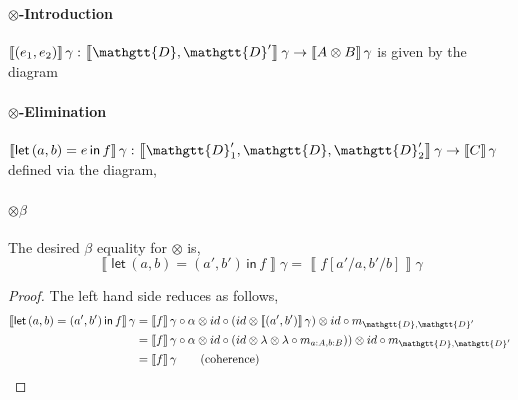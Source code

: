 \documentclass[acmsmall,nonacm]{acmart}
\renewcommand{\Delta}{\mathgtt{D}}
\newcommand{\sem}[1]{\left\llbracket{#1}\right\rrbracket}
\newcommand{\semg}[1]{\sem{#1}\gamma}
\newcommand{\letin}[3]{\mathsf{let}\, #1 = #2 \, \mathsf{in}\, #3}
\begin{document}
{\paragraph{$\otimes$-Introduction}
$\semg{(e_{1}, e_{2})} : \semg{\Delta,\Delta'} \to \semg{A \otimes B}$ is given
by the diagram

\begin{center}
\end{center}

\paragraph{$\otimes$-Elimination}
$\semg{\letin {(a,b)} e f} : \semg{\Delta'_{1},\Delta,\Delta'_{2}} \to \semg{C}$
defined via the diagram,

\begin{center}
\end{center}

\paragraph{$\otimes\beta$}
The desired $\beta$ equality for $\otimes$ is,
\[
  \semg{\letin {(a,b)} {(a',b')} {f}} = \semg{f[a'/a,b'/b]}
\]
\begin{proof}
The left hand side reduces as follows,
\begin{align*}
  \semg{\letin {(a,b)} {(a',b')} {f}}
  & = \semg{f} \circ \alpha \otimes id \circ (id \otimes \semg{(a' , b')}) \otimes id \circ m_{\Delta,\Delta'} \\
  & = \semg{f} \circ \alpha \otimes id \circ (id \otimes \lambda \otimes \lambda \circ m_{a : A, b : B})) \otimes id \circ m_{\Delta,\Delta'} \\
  & = \semg{f} \tag{coherence}
\end{align*}


\end{proof}}
\end{document}
